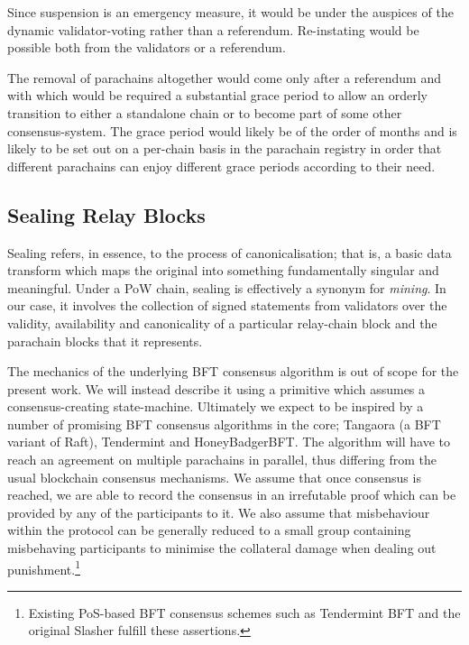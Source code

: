 \documentclass[9pt,oneside]{amsart}
\begin{document}
\begin{multicols}{2}
 Since suspension is an emergency measure, it would be under the auspices of the dynamic validator-voting rather than a referendum. Re-instating would be possible both from the validators or a referendum.

 The removal of parachains altogether would come only after a referendum and with which would be required a substantial grace period to allow an orderly transition to either a standalone chain or to become part of some other consensus-system. The grace period would likely be of the order of months and is likely to be set out on a per-chain basis in the parachain registry in order that different parachains can enjoy different grace periods according to their need.

\subsection{Sealing Relay Blocks}
\label{sealing-relay-blocks}

 Sealing refers, in essence, to the process of canonicalisation; that is, a basic data transform which maps the original into something fundamentally singular and meaningful. Under a PoW chain, sealing is effectively a synonym for \emph{mining}. In our case, it involves the collection of signed statements from validators over the validity, availability and canonicality of a particular relay-chain block and the parachain blocks that it represents.

 The mechanics of the underlying BFT consensus algorithm is out of scope for the present work. We will instead describe it using a primitive which assumes a consensus-creating state-machine. Ultimately we expect to be inspired by a number of promising BFT consensus algorithms in the core; Tangaora\cite{copeland2016tangaroa} (a BFT variant of Raft\cite{ongaro2014search}), Tendermint\cite{kwon2014tendermint} and HoneyBadgerBFT\cite{miller2016honey}. The algorithm will have to reach an agreement on multiple parachains in parallel, thus differing from the usual blockchain consensus mechanisms. We assume that once consensus is reached, we are able to record the consensus in an irrefutable proof which can be provided by any of the participants to it. We also assume that misbehaviour within the protocol can be generally reduced to a small group containing misbehaving participants to minimise the collateral damage when dealing out punishment.\footnote{Existing PoS-based BFT consensus schemes such as Tendermint BFT and the original Slasher fulfill these assertions.}


\end{multicols}
\end{document}
